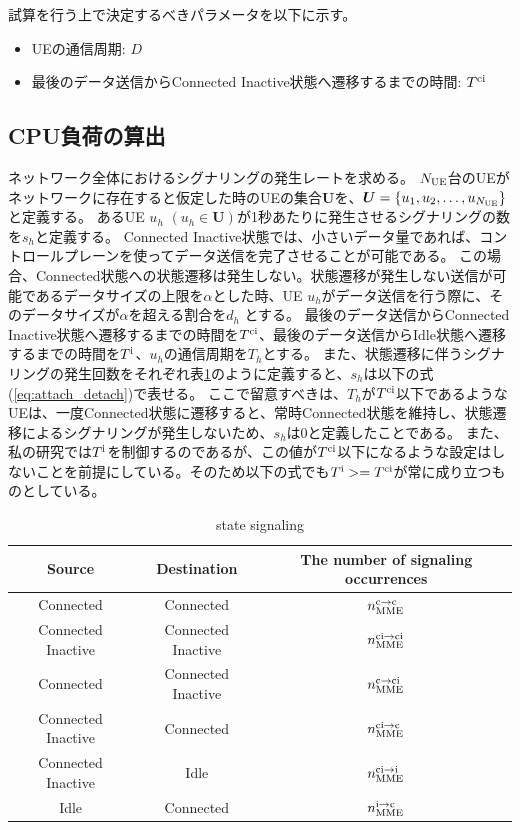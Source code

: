 \documentclass[a4j]{ujarticle}
\begin{document}
試算を行う上で決定するべきパラメータを以下に示す。
\begin{itemize}
  \item UEの通信周期: $D$
  \item 最後のデータ送信からConnected Inactive状態へ遷移するまでの時間: $T^{\rm ci}$
\end{itemize}
\subsection{CPU負荷の算出}
\label{sec:cpu}
ネットワーク全体におけるシグナリングの発生レートを求める。
$N_{\rm UE}$台のUEがネットワークに存在すると仮定した時のUEの集合$\bm{U}$を、$\bm{U} = \left\{ u_1,u_2,\ldots,u_{N_{\rm UE}} \right\}$と定義する。
あるUE $u_h$ $(u_h \in \bm{U})$が1秒あたりに発生させるシグナリングの数を$s_h$と定義する。
Connected Inactive状態では、小さいデータ量であれば、コントロールプレーンを使ってデータ送信を完了させることが可能である。
この場合、Connected状態への状態遷移は発生しない。状態遷移が発生しない送信が可能であるデータサイズの上限を$\alpha$とした時、UE $u_h$がデータ送信を行う際に、そのデータサイズが$\alpha$を超える割合を$d_h$ とする。
最後のデータ送信からConnected Inactive状態へ遷移するまでの時間を$T^{\rm ci}$、最後のデータ送信からIdle状態へ遷移するまでの時間を$T^{\rm i}$、$u_h$の通信周期を$T_h$とする。
また、状態遷移に伴うシグナリングの発生回数をそれぞれ表\ref{table:state}のように定義すると、$s_h$は以下の式(\ref{eq:attach_detach})で表せる。
ここで留意すべきは、$T_h$が$T^{\rm ci}$以下であるようなUEは、一度Connected状態に遷移すると、常時Connected状態を維持し、状態遷移によるシグナリングが発生しないため、$s_h$は0と定義したことである。
また、私の研究では$T^{\rm i}$を制御するのであるが、この値が$T^{\rm ci}$以下になるような設定はしないことを前提にしている。そのため以下の式でも$T^{\rm i} >= T^{\rm ci}$が常に成り立つものとしている。
\begin{table}[h]
 \caption{state signaling}
 \label{table:state}
 \centering
  \begin{tabular}{ccc}
   \hline
   Source & Destination & The number of signaling occurrences \\
   \hline \hline
   Connected & Connected & $n_{\rm MME}^{\rm c \to \rm c}$ \\
   Connected Inactive & Connected Inactive & $n_{\rm MME}^{\rm ci \to \rm ci}$ \\
   Connected & Connected Inactive & $n_{\rm MME}^{\rm c \to \rm ci}$ \\
   Connected Inactive & Connected & $n_{\rm MME}^{\rm ci \to \rm c}$ \\
   Connected Inactive & Idle & $n_{\rm MME}^{\rm ci \to \rm i}$ \\
   Idle & Connected  & $n_{\rm MME}^{\rm i \to \rm c}$ \\
   \hline
  \end{tabular}
\end{table}
\end{document}
